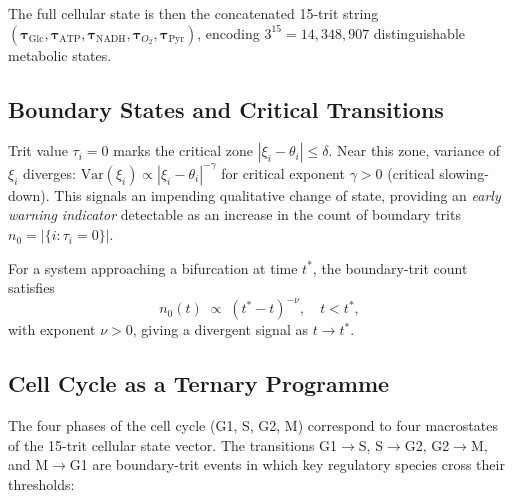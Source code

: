 The full cellular state is then the concatenated 15-trit string
$(\boldsymbol{\tau}_{\mathrm{Glc}},\boldsymbol{\tau}_{\mathrm{ATP}},
\boldsymbol{\tau}_{\mathrm{NADH}},\boldsymbol{\tau}_{O_2},
\boldsymbol{\tau}_{\mathrm{Pyr}})$, encoding $3^{15}=14{,}348{,}907$
distinguishable metabolic states.

\subsection{Boundary States and Critical Transitions}

Trit value $\tau_i=0$ marks the critical zone $|\xi_i-\theta_i|\leq\delta$.
Near this zone, variance of $\xi_i$ diverges:
$\mathrm{Var}(\xi_i)\propto|\xi_i-\theta_i|^{-\gamma}$ for critical
exponent $\gamma>0$ (critical slowing-down).  This signals an impending
qualitative change of state, providing an \emph{early warning indicator}
detectable as an increase in the count of boundary trits
$n_0=|\{i:\tau_i=0\}|$.

\begin{proposition}
\label{prop:ch03-early-warning}
For a system approaching a bifurcation at time $t^*$, the boundary-trit
count satisfies
\begin{equation}
    n_0(t) \;\propto\; (t^*-t)^{-\nu},\quad t<t^*,
    \label{eq:ch03-early-warning}
\end{equation}
with exponent $\nu>0$, giving a divergent signal as $t\to t^*$.
\end{proposition}

\subsection{Cell Cycle as a Ternary Programme}

The four phases of the cell cycle (G1, S, G2, M) correspond to four
macrostates of the 15-trit cellular state vector.  The transitions
G1$\to$S, S$\to$G2, G2$\to$M, and M$\to$G1 are boundary-trit events in
which key regulatory species cross their thresholds:

